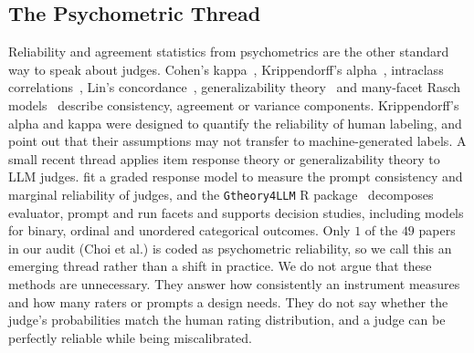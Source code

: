 \subsection{The Psychometric Thread}
\label{sec:supp-psych}
Reliability and agreement statistics from psychometrics are the other standard way to speak about judges.
Cohen's kappa~\citep{cohen1960coefficient}, Krippendorff's alpha~\citep{krippendorff1970estimating}, intraclass correlations~\citep{mcgraw1996forming}, Lin's concordance~\citep{lin1989concordance}, generalizability theory~\citep{shavelson1989generalizability} and many-facet Rasch models~\citep{linacre1989many} describe consistency, agreement or variance components.
Krippendorff's alpha and kappa were designed to quantify the reliability of human labeling, and \citet{elangovan2025beyond} point out that their assumptions may not transfer to machine-generated labels.
A small recent thread applies item response theory or generalizability theory to LLM judges.
\citet{choi2026diagnosing} fit a graded response model to measure the prompt consistency and marginal reliability of judges, and the \texttt{Gtheory4LLM} R package~\citep{liu2026gtheory4llm} decomposes evaluator, prompt and run facets and supports decision studies, including models for binary, ordinal and unordered categorical outcomes.
Only $1$ of the $49$ papers in our audit (Choi et al.) is coded as psychometric reliability, so we call this an emerging thread rather than a shift in practice.
We do not argue that these methods are unnecessary.
They answer how consistently an instrument measures and how many raters or prompts a design needs.
They do not say whether the judge's probabilities match the human rating distribution, and a judge can be perfectly reliable while being miscalibrated.

